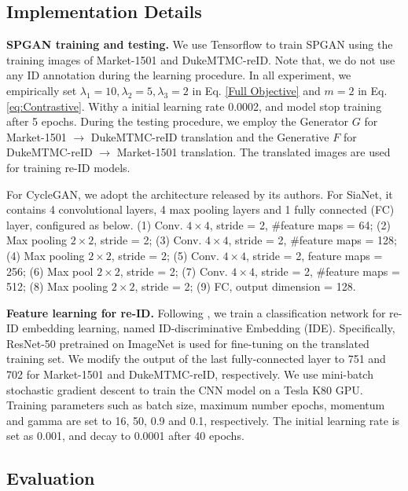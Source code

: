 \documentclass[10pt,twocolumn,letterpaper]{article}
\begin{document}
\subsection{Implementation Details} \label{implementation detail}
\textbf{SPGAN training and testing.} We use Tensorflow \cite{tensorflow} to train SPGAN using the training images of Market-1501 and DukeMTMC-reID. Note that, we do not use any ID annotation during the learning procedure. In all experiment, we empirically set $ \lambda_{1}=10, \lambda_{2}=5, \lambda_{3}=2$ in Eq. \ref{Full Objective} and $m=2$ in Eq. \ref{eq:Contrastive}. Withy a initial learning rate 0.0002, and model stop training after 5 epochs. During the testing procedure, we employ the Generator $G$ for Market-1501 $\to$ DukeMTMC-reID translation and the Generative $F$ for DukeMTMC-reID $\to$ Market-1501 translation. The translated images are used for training re-ID models.

{For CycleGAN, we adopt the architecture released by its authors. For SiaNet, it contains 4 convolutional layers, 4 max pooling layers and 1 fully connected (FC) layer, configured as below. (1) Conv. $4 \times 4$, stride = 2, \#feature maps = 64; (2) Max pooling $2 \times 2$, stride = 2; (3) Conv. $4 \times 4$, stride = 2, \#feature maps = 128; (4) Max pooling $2 \times 2$, stride = 2;  (5) Conv. $4 \times 4$, stride = 2, feature maps = 256; (6) Max pool $2 \times 2$, stride = 2; (7) Conv. $4 \times 4$, stride = 2, \#feature maps = 512; (8) Max pooling $2 \times 2$, stride = 2; (9) FC, output dimension = 128.}

\textbf{Feature learning for re-ID.} Following \cite{DBLP:journals/corr/ZhengYH16}, we train a classification network for re-ID embedding learning, named ID-discriminative Embedding (IDE). Specifically, ResNet-50 \cite{DBLP:conf/cvpr/HeZRS16} pretrained on ImageNet is used for fine-tuning on the translated training set. We modify the output of the last fully-connected layer to 751 and 702 for Market-1501 and DukeMTMC-reID, respectively. 
We use mini-batch stochastic gradient descent to train the CNN model on a Tesla K80 GPU. Training parameters such as batch size, maximum number epochs, momentum and gamma are set to 16, 50, 0.9 and 0.1, respectively. The initial learning rate is set as 0.001, and decay to 0.0001 after 40 epochs. 

\subsection{Evaluation} \label{compar baseline}
\end{document}

